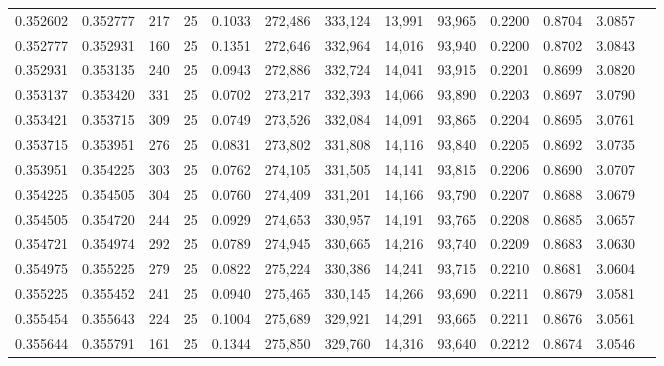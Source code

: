 \begin{tabular}{rrrrrrrrrrrrr}
0.352602 & 0.352777 &   217 &  25 &                                     0.1033 & 272,486 & 333,124 &  13,991 &  93,965 & 0.2200 & 0.8704 & 3.0857 \\
0.352777 & 0.352931 &   160 &  25 &                                     0.1351 & 272,646 & 332,964 &  14,016 &  93,940 & 0.2200 & 0.8702 & 3.0843 \\
0.352931 & 0.353135 &   240 &  25 &                                     0.0943 & 272,886 & 332,724 &  14,041 &  93,915 & 0.2201 & 0.8699 & 3.0820 \\
0.353137 & 0.353420 &   331 &  25 &                                     0.0702 & 273,217 & 332,393 &  14,066 &  93,890 & 0.2203 & 0.8697 & 3.0790 \\
0.353421 & 0.353715 &   309 &  25 &                                     0.0749 & 273,526 & 332,084 &  14,091 &  93,865 & 0.2204 & 0.8695 & 3.0761 \\
0.353715 & 0.353951 &   276 &  25 &                                     0.0831 & 273,802 & 331,808 &  14,116 &  93,840 & 0.2205 & 0.8692 & 3.0735 \\
0.353951 & 0.354225 &   303 &  25 &                                     0.0762 & 274,105 & 331,505 &  14,141 &  93,815 & 0.2206 & 0.8690 & 3.0707 \\
0.354225 & 0.354505 &   304 &  25 &                                     0.0760 & 274,409 & 331,201 &  14,166 &  93,790 & 0.2207 & 0.8688 & 3.0679 \\
0.354505 & 0.354720 &   244 &  25 &                                     0.0929 & 274,653 & 330,957 &  14,191 &  93,765 & 0.2208 & 0.8685 & 3.0657 \\
0.354721 & 0.354974 &   292 &  25 &                                     0.0789 & 274,945 & 330,665 &  14,216 &  93,740 & 0.2209 & 0.8683 & 3.0630 \\
0.354975 & 0.355225 &   279 &  25 &                                     0.0822 & 275,224 & 330,386 &  14,241 &  93,715 & 0.2210 & 0.8681 & 3.0604 \\
0.355225 & 0.355452 &   241 &  25 &                                     0.0940 & 275,465 & 330,145 &  14,266 &  93,690 & 0.2211 & 0.8679 & 3.0581 \\
0.355454 & 0.355643 &   224 &  25 &                                     0.1004 & 275,689 & 329,921 &  14,291 &  93,665 & 0.2211 & 0.8676 & 3.0561 \\
0.355644 & 0.355791 &   161 &  25 &                                     0.1344 & 275,850 & 329,760 &  14,316 &  93,640 & 0.2212 & 0.8674 & 3.0546 \\

\end{tabular}
